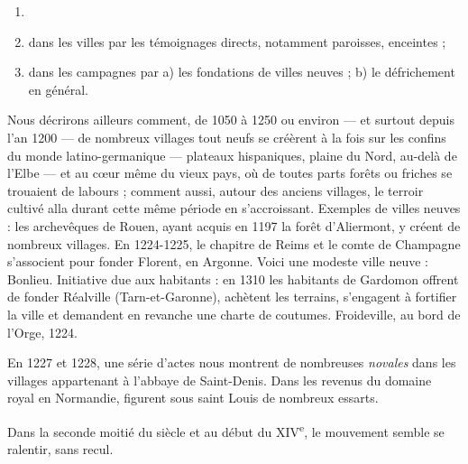 \documentclass[french,twoside]{book} %
\begin{document}
\begin{enumerate}[itemsep=0pt,]
\item[] \hspace{-1.5em}{\bfseries Connu :}
\item dans les villes par les témoignages directs, notamment paroisses, enceintes ;
\item dans les campagnes par a) les fondations de villes neuves ; b) le défrichement en général.

\end{enumerate}\noindent Nous décrirons ailleurs comment, de 1050 à 1250 ou environ — et surtout depuis l’an 1200 — de nombreux villages tout neufs se créèrent à la fois sur les confins du monde latino-germanique — plateaux hispaniques, plaine du Nord, au-delà de l’Elbe — et au cœur même du vieux pays, où de toutes parts forêts ou friches se trouaient de labours ; comment aussi, autour des anciens villages, le terroir cultivé alla durant cette même période en s’accroissant. Exemples de villes neuves : les archevêques de Rouen, ayant acquis en 1197 la forêt d’Aliermont, y créent de nombreux villages. En 1224-1225, le chapitre de Reims et le comte de Champagne s’associent pour fonder Florent, en Argonne. Voici une modeste ville neuve : Bonlieu. Initiative due aux habitants : en 1310 les habitants de Gardomon offrent de fonder Réalville (Tarn-et-Garonne), achètent les terrains, s’engagent à fortifier la ville et demandent en revanche une charte de coutumes. Froideville, au bord de l’Orge, 1224.\par
En 1227 et 1228, une série d’actes nous montrent de nombreuses {\itshape novales} dans les villages appartenant à l’abbaye de Saint-Denis. Dans les revenus du domaine royal en Normandie, figurent sous saint Louis de nombreux essarts.\par
Dans la seconde moitié du siècle et au début du XIV\textsuperscript{e}, le mouvement semble se ralentir, sans recul.\par
\end{document}
